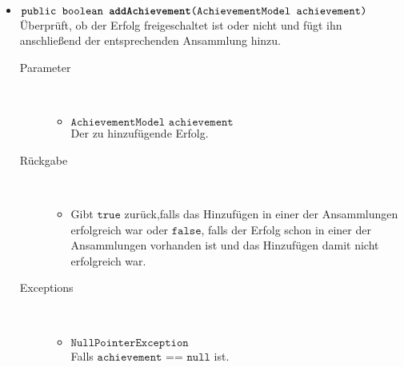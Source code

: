 \begin{description}
\begin{itemize}
		\item $\texttt{public boolean \textbf{addAchievement}(AchievementModel achievement)}$ \\ Überprüft, ob der Erfolg freigeschaltet ist oder nicht und fügt ihn anschließend der entsprechenden Ansammlung hinzu.
		\begin{description}
			\item[Parameter] \hfill \\
			\vspace{-.8cm}
			\begin{itemize}
				\item $\texttt{AchievementModel achievement}$ \\ Der zu hinzufügende Erfolg.
			\end{itemize}
			\item[Rückgabe] \hfill \\
			\vspace{-.8cm}
			\begin{itemize}
				\item Gibt $\texttt{true}$ zurück,falls das Hinzufügen in einer der Ansammlungen erfolgreich war oder $\texttt{false}$, falls der Erfolg schon in einer der Ansammlungen vorhanden ist und das Hinzufügen damit nicht erfolgreich war.
			\end{itemize}
			\item[Exceptions] \hfill \\
			\vspace{-.8cm}
			\begin{itemize}
				\item $\texttt{NullPointerException}$ \\ Falls $\texttt{achievement == null}$ ist.
			\end{itemize}
		\end{description}	


\end{itemize}
\end{description}
